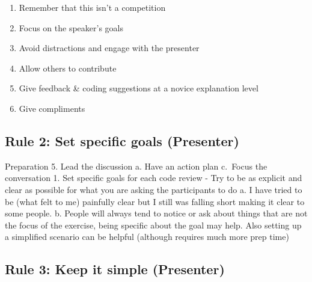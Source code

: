 \documentclass[
  11pt,
]{article}
\providecommand{\tightlist}{%
  \setlength{\itemsep}{0pt}\setlength{\parskip}{0pt}}
\begin{document}
\begin{enumerate}
\begin{enumerate}
\begin{enumerate}
      \begin{enumerate}
      \def\labelenumiv{\arabic{enumiv}.}
      \tightlist
      \item
        Remember that this isn't a competition
      \item
        Focus on the speaker's goals
      \item
        Avoid distractions and engage with the presenter
      \item
        Allow others to contribute
      \item
        Give feedback \& coding suggestions at a novice explanation
        level
      \item
        Give compliments
      \end{enumerate}
    \end{enumerate}
  \end{enumerate}
\end{enumerate}

\hypertarget{rule-2-set-specific-goals-presenter}{%
\subsection{Rule 2: Set specific goals
(Presenter)}\label{rule-2-set-specific-goals-presenter}}

Preparation 5. Lead the discussion a. Have an action plan c.~Focus the
conversation 1. Set specific goals for each code review - Try to be as
explicit and clear as possible for what you are asking the participants
to do a. I have tried to be (what felt to me) painfully clear but I
still was falling short making it clear to some people. b. People will
always tend to notice or ask about things that are not the focus of the
exercise, being specific about the goal may help. Also setting up a
simplified scenario can be helpful (although requires much more prep
time)

\hypertarget{rule-3-keep-it-simple-presenter}{%
\subsection{Rule 3: Keep it simple
(Presenter)}\label{rule-3-keep-it-simple-presenter}}
\end{document}
